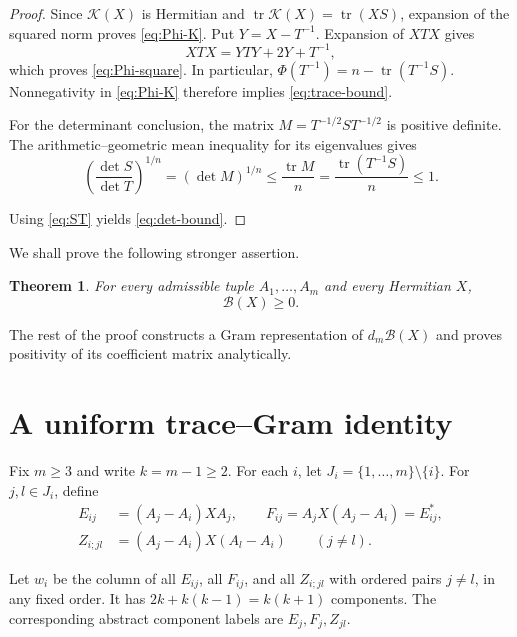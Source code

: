 \documentclass[11pt]{article}
\newtheorem{theorem}{Theorem}[section]
\newcommand{\tr}{\operatorname{tr}}
\newcommand{\cK}{\mathcal K}
\newcommand{\cB}{\mathcal B}
\begin{document}
\begin{proof}
Since \(\cK(X)\) is Hermitian and
\(\tr\cK(X)=\tr(XS)\), expansion of the squared norm proves
\eqref{eq:Phi-K}. Put \(Y=X-T^{-1}\). Expansion of \(XTX\) gives
\[
 XTX=YTY+2Y+T^{-1},
\]
which proves \eqref{eq:Phi-square}. In particular,
\(\Phi(T^{-1})=n-\tr(T^{-1}S)\). Nonnegativity in
\eqref{eq:Phi-K} therefore implies \eqref{eq:trace-bound}.

For the determinant conclusion, the matrix
\(M=T^{-1/2}ST^{-1/2}\) is positive definite. The arithmetic--geometric
mean inequality for its eigenvalues gives
\begin{equation}\label{eq:AMGM}
 \left(\frac{\det S}{\det T}\right)^{1/n}
 =(\det M)^{1/n}
 \le\frac{\tr M}{n}
 =\frac{\tr(T^{-1}S)}{n}\le1.
\end{equation}

Using \eqref{eq:ST} yields \eqref{eq:det-bound}.
\end{proof}

We shall prove the following stronger assertion.
\begin{theorem}\label{thm:quadratic}
For every admissible tuple \(A_1,\ldots,A_m\) and every Hermitian \(X\),
\begin{equation}\label{eq:quadratic}
 \cB(X)\ge0.
\end{equation}
\end{theorem}

The rest of the proof constructs a Gram representation of
\(d_m\cB(X)\) and proves positivity of its coefficient matrix
analytically.

\section{A uniform trace--Gram identity}

Fix \(m\ge3\) and write \(k=m-1\ge2\). For each \(i\), let
\(J_i=\{1,\ldots,m\}\setminus\{i\}\). For \(j,l\in J_i\), define
\begin{align}
 E_{ij}&=(A_j-A_i)XA_j,\qquad
 F_{ij}=A_jX(A_j-A_i)=E_{ij}^*, \label{eq:EF}\\
 Z_{i;jl}&=(A_j-A_i)X(A_l-A_i)\qquad(j\ne l).
 \label{eq:Z}
\end{align}

Let \(w_i\) be the column of all \(E_{ij}\), all \(F_{ij}\), and all
\(Z_{i;jl}\) with ordered pairs \(j\ne l\), in any fixed order.
It has \(2k+k(k-1)=k(k+1)\) components.
The corresponding abstract component labels are \(E_j,F_j,Z_{jl}\).
\end{document}
